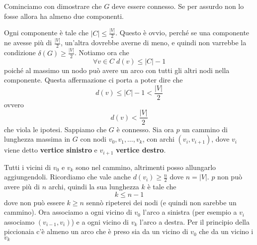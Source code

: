 \documentclass[12pt]{report}
\begin{document}
\begin{dimo}
    Cominciamo con dimostrare che $G$ deve essere connesso. Se per assurdo non lo fosse allora ha almeno due componenti. 

    Ogni componente è tale che $|C| \leq \frac{|V|}{2}$. Questo è ovvio, perché se una componente ne avesse più di $\frac{|V|}{2}$, un'altra dovrebbe averne di meno, e quindi non varrebbe la condizione $\delta(G) \geq \frac{|V|}{2}$. Notiamo ora che $$\forall v \in C \; d(v) \leq |C| - 1 $$ poiché al massimo un nodo può avere un arco con tutti gli altri nodi nella componente. Questa affermazione ci porta a poter dire che 
    $$d(v) \leq |C| - 1 < \frac{|V|}{2}$$
    ovvero
    $$d(v) < \frac{|V|}{2}$$
    che viola le ipotesi. 
    Sappiamo che $G$ è connesso. Sia ora $p$ un cammino di lunghezza massima in $G$ con nodi $v_0,v_1,\dots,v_k$, con archi $(v_i,v_{i+1})$, dove $v_i$ viene detto \textbf{vertice sinistro} e $v_{i+1}$ \textbf{vertice destro}.


    \noindent 
    Tutti i vicini di $v_0$ e $v_k$ sono nel cammino, altrimenti posso allungarlo aggiungendoli. Ricordiamo che vale anche $d(v_i) \geq \frac{n}{2}$ dove $n = |V|$. $p$ non può avere più di $n$ archi, quindi la sua lunghezza $k$ è tale che
        $$k \leq n-1$$
    dove non può essere $k \geq n$ sennò ripeterei dei nodi (e quindi non sarebbe un cammino). Ora associamo a ogni vicino di $v_0$ l'arco a sinistra (per esempio a $v_i$ associamo $(v_{i-1},v_i)$) e a ogni vicino di $v_k$ l'arco a destra. Per il principio della piccionaia c'è almeno un arco che è preso sia da un vicino di $v_0$ che da un vicino i $v_k$

\end{dimo}
\end{document}
